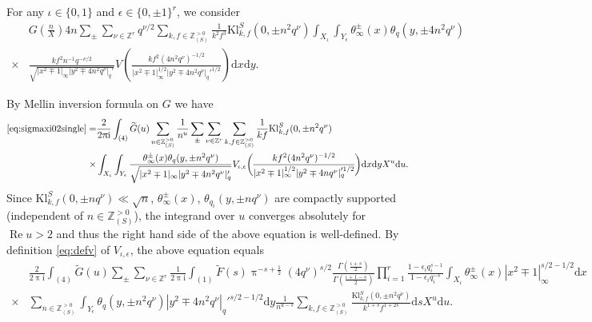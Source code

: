 \documentclass[10pt,oneside,reqno]{amsart}
\makeatletter
\newcommand\rmd{\mathrm{d}}
\newcommand\rmi{\mathrm{i}}
\newcommand\ZZ{\mathbb{Z}}
\newcommand\dpii{2\uppi\rmi}
\renewcommand\Re{\mathop{\mathrm{Re}}}
\newcommand\Kl{\mathrm{Kl}}
\newcommand\legendresymbol[2]{\genfrac{(}{)}{}{}{#1}{#2}}
\theoremstyle{THEOREM}
\theoremstyle{DEFINITION}
\theoremstyle{EXERCISE}
\numberwithin{equation}{section}
\renewenvironment{proof}[1][\proofname]{\par
  \vspace{-6pt}
  \pushQED{\qed}
  \normalfont \topsep6\p@\@plus6\p@\relax
  \trivlist
  \item[\hskip\labelsep\rmfamily\bfseries
    #1\@addpunct{:}]\ignorespaces
}{
  \popQED\endtrivlist\@endpefalse
  \vspace{-6pt}
}
\makeatother
\begin{document}
\begin{proof}
For any $\iota\in \{0,1\}$ and $\epsilon\in \{0,\pm 1\}^r$, we consider 
\begin{equation}\label{eq:sigmaxi02single}
\begin{split}
&G\legendresymbol{n}{X} 4n\sum_{\pm}\sum_{\nu\in \ZZ^r}q^{\nu/2}\sum_{k,f\in \ZZ_{(S)}^{>0}}\frac{1}{k^2f^3}\Kl_{k,f}^S(0,\pm n^2q^\nu)\int_{X_\iota}\int_{Y_\epsilon}\theta_\infty^\pm(x)\theta_{q}(y,\pm 4n^2q^\nu) \\
  \times&\frac{kf^2n^{-1}q^{-\nu/2}}{\sqrt{|x^2\mp 1|_\infty|y^2\mp 4n^2q^\nu|_q'}}V\legendresymbol{kf^2(4n^2q^\nu)^{-1/2}}{|x^2\mp 1|_\infty^{1/2}|y^2\mp 4n^2q^\nu|_q'^{1/2}}\rmd x\rmd y.
\end{split}
\end{equation}

By Mellin inversion formula on $G$ we have
\begin{align*}
\eqref{eq:sigmaxi02single}=&\frac{2}{\dpii} \int_{(4)}\widetilde{G}(u)\sum_{n\in \ZZ_{(S)}^{>0}}\frac{1}{n^u}\sum_{\pm}\sum_{\nu\in \ZZ^r}\sum_{k,f\in \ZZ_{(S)}^{>0}}\frac{1}{kf}\Kl_{k,f}^S(0,\pm n^2q^\nu)\\
  \times&\int_{X_\iota}\int_{Y_\epsilon}\frac{\theta_\infty^\pm(x)\theta_{q}(y,\pm n^2q^\nu)}{\sqrt{|x^2\mp 1|_\infty|y^2\mp 4n^2q^\nu|_q'}} V_{\iota,\epsilon}\legendresymbol{kf^2(4n^2q^\nu)^{-1/2}}{|x^2\mp 1|_\infty^{1/2}|y^2\mp 4nq^\nu|_q'^{1/2}}\rmd x\rmd yX^u\rmd u.
\end{align*}
Since $\Kl_{k,f}^S(0,\pm nq^\nu)\ll \sqrt{n}$, $\theta_\infty^\pm(x)$, $\theta_{q_i}(y,\pm nq^\nu)$ are compactly supported (independent of $n\in \ZZ_{(S)}^{>0}$), the integrand over $u$ converges absolutely for $\Re u>2$ and thus the right hand side of the above equation is well-defined. By definition \eqref{eq:defv} of $V_{\iota,\epsilon}$, the above equation equals
\begin{align*}
&\frac{2}{\dpii} \int_{(4)}\widetilde{G}(u)\sum_{\pm}\sum_{\nu\in \ZZ^r}\frac{1}{\dpii}\int_{(1)}\widetilde{F}(s)\uppi^{-s+\frac12}(4q^\nu)^{s/2} \frac{\Gamma(\frac{\iota+s}{2})}{\Gamma(\frac{\iota+1-s}{2})}\prod_{i=1}^{r}\frac{1-\epsilon_i q_i^{s-1}}{1-\epsilon_iq_i^{-s}} \int_{X_\iota}\theta_\infty^\pm(x)|x^2\mp 1|_\infty^{s/2-1/2}\rmd x\\
  \times& \sum_{n\in \ZZ_{(S)}^{>0}}\int_{Y_\epsilon}\theta_{q}(y,\pm n^2q^\nu)|y^2\mp 4n^2q^\nu|_q'^{s/2-1/2}\rmd y\frac{1}{n^{u-s}}\sum_{k,f\in \ZZ_{(S)}^{>0}}
  \frac{\Kl_{k,f}^S(0,\pm n^2q^\nu)}{k^{1+s}f^{1+2s}}\rmd s X^u\rmd u.
\end{align*}

\end{proof}
\end{document}
